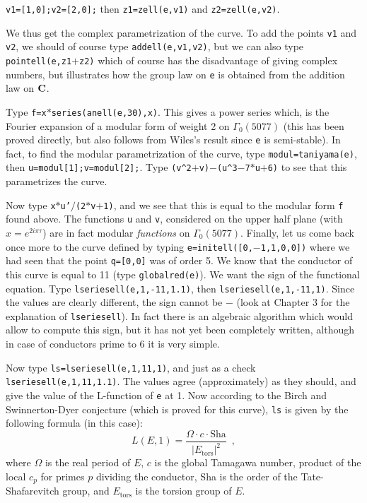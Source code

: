 {\tt v1=[1,0];v2=[2,0];} then {\tt z1=zell(e,v1)} and {\tt z2=zell(e,v2)}.

We thus get the complex parametrization of the curve. To add the points
{\tt v1} and {\tt v2}, we should of course type {\tt addell(e,v1,v2)},
but we can also type {\tt pointell(e,z1$+$z2)} which of course has the
disadvantage of giving complex numbers, but illustrates how the group law
on {\tt e} is obtained from the addition law on $\Bbb C$.

Type {\tt f=x$*$series(anell(e,30),x)}. This gives a power series which,
is the Fourier expansion of a modular form of weight 2 on $\Gamma_0(5077)$
(this has been proved directly, but also follows from Wiles's result since
{\tt e} is semi-stable). In fact, to find the modular parametrization of
the curve, type {\tt modul=taniyama(e)}, then {\tt u=modul[1];v=modul[2];}.
Type {\tt (v\^{}2$+$v)$-$(u\^{}3$-$7$*$u$+$6)} to see that this parametrizes
the curve.

Now type {\tt x$*$u'$/$(2$*$v$+$1)}, and we see that this is equal to the
modular form {\tt f} found above. The functions {\tt u} and {\tt v}, considered
on the upper half plane (with $x=e^{2i\pi\tau}$) are in fact modular 
{\it functions} on $\Gamma_0(5077)$.
\smallskip
Finally, let us come back once more to the curve defined by typing
{\tt e=initell([0,$-$1,1,0,0])} where we had seen that the point {\tt q=[0,0]}
was of order 5. We know that the conductor of this curve is equal to 11
(type {\tt globalred(e)}). We want the sign of the functional equation.
Type {\tt lseriesell(e,1,-11,1.1)}, then {\tt lseriesell(e,1,-11,1)}. Since
the values are clearly different, the sign cannot be $-$ (look at Chapter 3
for the explanation of {\tt lseriesell}). In fact there is an algebraic 
algorithm which would allow to compute this sign, but it has not yet been
completely written, although in case of conductors prime to 6 it is very
simple.

Now type {\tt ls=lseriesell(e,1,11,1)}, and just as a check
{\tt lseriesell(e,1,11,1.1)}. The values agree (approximately) as they should,
and give the value of the L-function of {\tt e} at 1. Now according to
the Birch and Swinnerton-Dyer conjecture (which is proved for this curve),
{\tt ls} is given by the following formula (in this case):
$$L(E,1)=\dfrac{\Omega\cdot c\cdot\text{Sha}}{|E_{\text{tors}}|^2}\enspace,$$
where $\Omega$ is the real period of $E$, $c$ is the global Tamagawa number,
product of the local $c_p$ for primes $p$ dividing the conductor, Sha is the
order of the Tate-Shafarevitch group, and $E_{\text{tors}}$ is the torsion
group of $E$.

